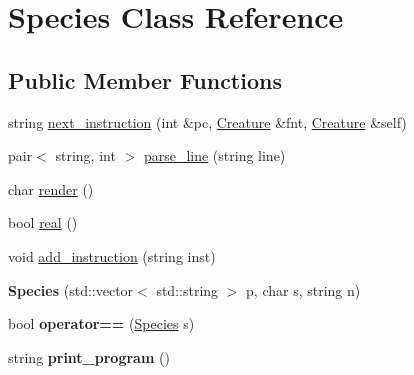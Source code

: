 \hypertarget{classSpecies}{\section{Species Class Reference}
\label{classSpecies}
}
\subsection*{Public Member Functions}
\begin{DoxyCompactItemize}
\item 
string \hyperlink{classSpecies_ad2b5c09ce528d3310d9c0ee144a56aa5}{next\-\_\-instruction} (int \&pc, \hyperlink{classCreature}{Creature} \&fnt, \hyperlink{classCreature}{Creature} \&self)
\item 
pair$<$ string, int $>$ \hyperlink{classSpecies_ad9bc32bb3eb1039bb45630f1845ea9d3}{parse\-\_\-line} (string line)
\item 
char \hyperlink{classSpecies_a77bad9b75b82dbf719abe87925ef3745}{render} ()
\item 
bool \hyperlink{classSpecies_ac458aa1dfe5f7a72686323339f8412ec}{real} ()
\item 
void \hyperlink{classSpecies_a2578012dea60323f75b03a65dc7ba54e}{add\-\_\-instruction} (string inst)
\item 
\hypertarget{classSpecies_a67e8788a43c9f8052203cc8c7dadbf3c}{{\bfseries Species} (std\-::vector$<$ std\-::string $>$ p, char s, string n)}\label{classSpecies_a67e8788a43c9f8052203cc8c7dadbf3c}

\item 
\hypertarget{classSpecies_a1c655e6b935bb1da8cbfb5ed19e00883}{bool {\bfseries operator==} (\hyperlink{classSpecies}{Species} s)}\label{classSpecies_a1c655e6b935bb1da8cbfb5ed19e00883}

\item 
\hypertarget{classSpecies_a33c2bb360c575715c3c6b024fb5cbdfa}{string {\bfseries print\-\_\-program} ()}\label{classSpecies_a33c2bb360c575715c3c6b024fb5cbdfa}

\end{DoxyCompactItemize}



